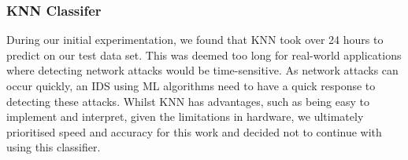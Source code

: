 \subsubsection{KNN Classifer}

During our initial experimentation, we found that KNN took over 24 hours to predict on our test data set. This was deemed too long for real-world applications where detecting network attacks would be time-sensitive. As network attacks can occur quickly, an IDS using ML algorithms need to have a quick response to detecting these attacks.
Whilst KNN has advantages, such as being easy to implement and interpret, given the limitations in hardware, we ultimately prioritised speed and accuracy for this work and decided not to continue with using this classifier.